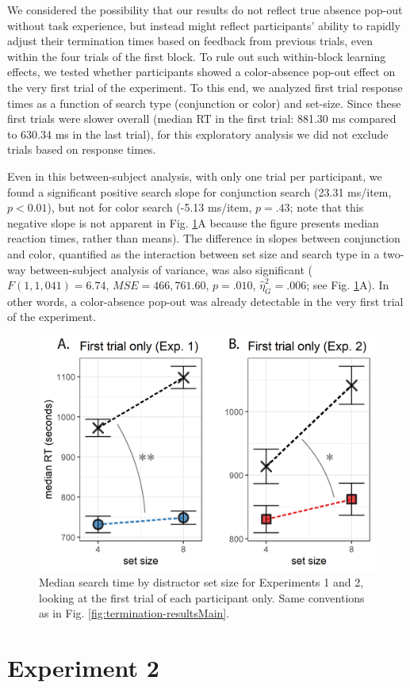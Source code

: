 \documentclass[12pt,twoside]{reedthesis}
\begin{document}
We considered the possibility that our results do not reflect true absence pop-out without task experience, but instead might reflect participants' ability to rapidly adjust their termination times based on feedback from previous trials, even within the four trials of the first block. To rule out such within-block learning effects, we tested whether participants showed a color-absence pop-out effect on the very first trial of the experiment. To this end, we analyzed first trial response times as a function of search type (conjunction or color) and set-size. Since these first trials were slower overall (median RT in the first trial: 881.30 ms compared to 630.34 ms in the last trial), for this exploratory analysis we did not exclude trials based on response times.

Even in this between-subject analysis, with only one trial per participant, we found a significant positive search slope for conjunction search (23.31 ms/item, \(p<0.01\)), but not for color search (-5.13 ms/item, \(p=.43\); note that this negative slope is not apparent in Fig. \ref{fig:termination-firstTrial}A because the figure presents median reaction times, rather than means). The difference in slopes between conjunction and color, quantified as the interaction between set size and search type in a two-way between-subject analysis of variance, was also significant (\(F(1, 1,041) = 6.74\), \(\mathit{MSE} = 466,761.60\), \(p = .010\), \(\hat{\eta}^2_G = .006\); see Fig. \ref{fig:termination-firstTrial}A). In other words, a color-absence pop-out was already detectable in the very first trial of the experiment.


\begin{figure}
\includegraphics[width=1\linewidth]{figure/termination/results_first_trials_with_stars} \caption[First-trial analysis]{Median search time by distractor set size for Experiments 1 and 2, looking at the first trial of each participant only. Same conventions as in Fig. \ref{fig:termination-resultsMain}.}\label{fig:termination-firstTrial}
\end{figure}
\hypertarget{experiment-2}{%
\section{Experiment 2}\label{experiment-2}}
\end{document}
